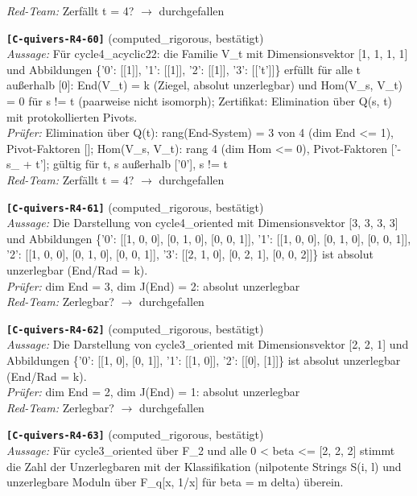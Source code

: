 \documentclass[11pt]{article}
\theoremstyle{definition}\newtheorem{definition}[theorem]{Definition}\newtheorem{remark}[theorem]{Remark}\newtheorem{observation}[theorem]{Numerical observation}
\begin{document}
\textit{Red-Team:} Zerfällt t = 4? $\to$ durchgefallen\par\medskip
\noindent\textbf{\texttt{[C-quivers-R4-60]}} (computed\_rigorous, bestätigt)\\
\textit{Aussage:} Für cycle4\_acyclic22: die Familie V\_t mit Dimensionsvektor [1, 1, 1, 1] und Abbildungen \{'0': [[1]], '1': [[1]], '2': [[1]], '3': [['t']]\} erfüllt für alle t außerhalb [0]: End(V\_t) = k (Ziegel, absolut unzerlegbar) und Hom(V\_s, V\_t) = 0 für s != t (paarweise nicht isomorph); Zertifikat: Elimination über Q(s, t) mit protokollierten Pivots.\\
\textit{Prüfer:} Elimination über Q(t): rang(End-System) = 3 von 4 (dim End <= 1), Pivot-Faktoren []; Hom(V\_s, V\_t): rang 4 (dim Hom <= 0), Pivot-Faktoren ['-s\_ + t']; gültig für t, s außerhalb ['0'], s != t\\
\textit{Red-Team:} Zerfällt t = 4? $\to$ durchgefallen\par\medskip
\noindent\textbf{\texttt{[C-quivers-R4-61]}} (computed\_rigorous, bestätigt)\\
\textit{Aussage:} Die Darstellung von cycle4\_oriented mit Dimensionsvektor [3, 3, 3, 3] und Abbildungen \{'0': [[1, 0, 0], [0, 1, 0], [0, 0, 1]], '1': [[1, 0, 0], [0, 1, 0], [0, 0, 1]], '2': [[1, 0, 0], [0, 1, 0], [0, 0, 1]], '3': [[2, 1, 0], [0, 2, 1], [0, 0, 2]]\} ist absolut unzerlegbar (End/Rad = k).\\
\textit{Prüfer:} dim End = 3, dim J(End) = 2: absolut unzerlegbar\\
\textit{Red-Team:} Zerlegbar? $\to$ durchgefallen\par\medskip
\noindent\textbf{\texttt{[C-quivers-R4-62]}} (computed\_rigorous, bestätigt)\\
\textit{Aussage:} Die Darstellung von cycle3\_oriented mit Dimensionsvektor [2, 2, 1] und Abbildungen \{'0': [[1, 0], [0, 1]], '1': [[1, 0]], '2': [[0], [1]]\} ist absolut unzerlegbar (End/Rad = k).\\
\textit{Prüfer:} dim End = 2, dim J(End) = 1: absolut unzerlegbar\\
\textit{Red-Team:} Zerlegbar? $\to$ durchgefallen\par\medskip
\noindent\textbf{\texttt{[C-quivers-R4-63]}} (computed\_rigorous, bestätigt)\\
\textit{Aussage:} Für cycle3\_oriented über F\_2 und alle 0 < beta <= [2, 2, 2] stimmt die Zahl der Unzerlegbaren mit der Klassifikation (nilpotente Strings S(i, l) und unzerlegbare Moduln über F\_q[x, 1/x] für beta = m delta) überein.\\
\end{document}
